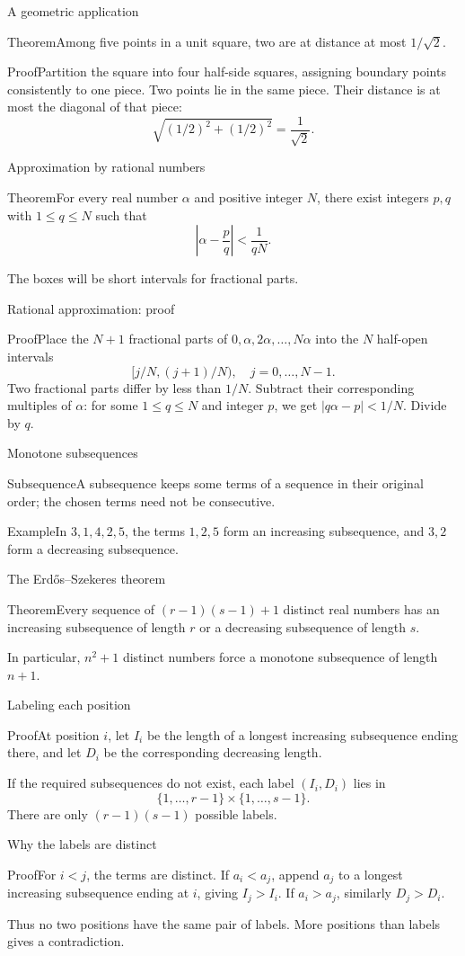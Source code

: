 \documentclass[aspectratio=169,11pt]{beamer}
\newcommand{\Def}[2]{\begin{block}{#1}#2\end{block}}
\newcommand{\Thm}[2]{\begin{block}{#1}#2\end{block}}
\renewcommand{\Proof}[1]{\begin{block}{Proof}\normalsize #1\end{block}}
\renewcommand{\Example}[1]{\begin{block}{Example}#1\end{block}}
\newcommand{\gap}{\par\medskip}
\begin{document}
\begin{frame}{A geometric application}
\large
\Thm{Theorem}{Among five points in a unit square, two are at distance at most $1/\sqrt2$.}
\Proof{Partition the square into four half-side squares, assigning boundary points consistently to one piece. Two points lie in the same piece. Their distance is at most the diagonal of that piece:
\[\sqrt{(1/2)^2+(1/2)^2}=\frac1{\sqrt2}.\]}
\end{frame}
\begin{frame}{Approximation by rational numbers}
\large
\Thm{Theorem}{For every real number $\alpha$ and positive integer $N$, there exist integers $p,q$ with $1\leq q\leq N$ such that
\[\left|\alpha-\frac pq\right|<\frac1{qN}.\]}
\gap The boxes will be short intervals for fractional parts.
\end{frame}
\begin{frame}{Rational approximation: proof}
\large
\Proof{Place the $N+1$ fractional parts of $0,\alpha,2\alpha,\ldots,N\alpha$ into the $N$ half-open intervals
\[[j/N,(j+1)/N),\quad j=0,\ldots,N-1.\]
Two fractional parts differ by less than $1/N$. Subtract their corresponding multiples of $\alpha$: for some $1\leq q\leq N$ and integer $p$, we get $|q\alpha-p|<1/N$. Divide by $q$.}
\end{frame}
\begin{frame}{Monotone subsequences}
\large
\Def{Subsequence}{A subsequence keeps some terms of a sequence in their original order; the chosen terms need not be consecutive.}
\Example{In $3,1,4,2,5$, the terms $1,2,5$ form an increasing subsequence, and $3,2$ form a decreasing subsequence.}
\end{frame}
\begin{frame}{The Erd\H{o}s--Szekeres theorem}
\large
\Thm{Theorem}{Every sequence of $(r-1)(s-1)+1$ distinct real numbers has an increasing subsequence of length $r$ or a decreasing subsequence of length $s$.}
\gap In particular, $n^2+1$ distinct numbers force a monotone subsequence of length $n+1$.
\end{frame}
\begin{frame}{Labeling each position}
\large
\Proof{At position $i$, let $I_i$ be the length of a longest increasing subsequence ending there, and let $D_i$ be the corresponding decreasing length.\gap If the required subsequences do not exist, each label $(I_i,D_i)$ lies in
\[\{1,\ldots,r-1\}\times\{1,\ldots,s-1\}.\]
There are only $(r-1)(s-1)$ possible labels.}
\end{frame}
\begin{frame}{Why the labels are distinct}
\large
\Proof{For $i<j$, the terms are distinct. If $a_i<a_j$, append $a_j$ to a longest increasing subsequence ending at $i$, giving $I_j>I_i$. If $a_i>a_j$, similarly $D_j>D_i$.\gap Thus no two positions have the same pair of labels. More positions than labels gives a contradiction.}
\end{frame}
\end{document}
